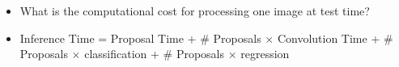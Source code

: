 \begin{frame}
	\begin{center}
		
	\end{center}

	\begin{overlayarea}{\textwidth}{\textheight}
		\begin{itemize}
			\justifying
			\item<1-> What is the computational cost for processing one image at test time?
			\item<2-> Inference Time = Proposal Time + $\#$ Proposals $\times$ Convolution Time  +  $\#$ Proposals $\times$ classification + $\#$ Proposals $\times$ regression 
		\end{itemize}

	\end{overlayarea}
\end{frame}



